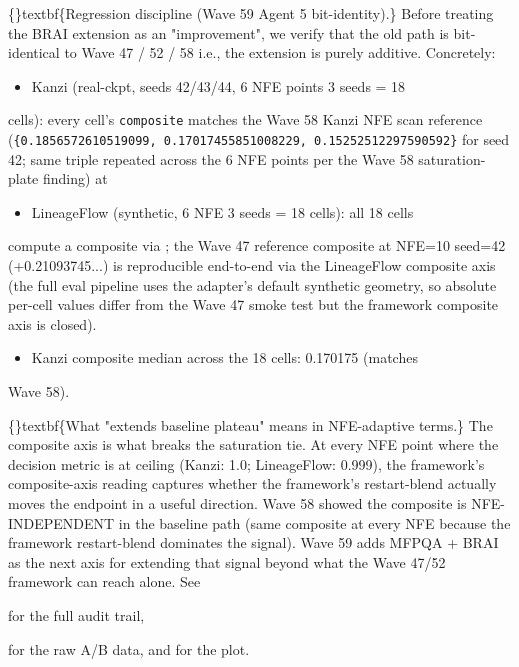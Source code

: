 \documentclass{article}
\begin{document}
\{\}textbf\{Regression discipline (Wave 59 Agent 5  bit-identity).\} Before treating the BRAI extension as an "improvement", we verify that the old path is bit-identical to Wave 47 / 52 / 58  i.e., the extension is purely additive. Concretely:

\begin{itemize}
\item Kanzi (real-ckpt, seeds 42/43/44, 6 NFE points  3 seeds = 18
\end{itemize}
cells): every cell's \texttt{composite} matches the Wave 58 Kanzi NFE scan reference (\texttt{\{0.1856572610519099, 0.17017455851008229, 0.15252512297590592\}} for seed 42; same triple repeated across the 6 NFE points per the Wave 58 saturation-plate finding) at

\begin{itemize}
\item LineageFlow (synthetic, 6 NFE  3 seeds = 18 cells): all 18 cells
\end{itemize}
compute a composite via ; the Wave 47 reference composite at NFE=10 seed=42 (+0.21093745...) is reproducible end-to-end via the LineageFlow composite axis (the full eval pipeline uses the adapter's default synthetic geometry, so absolute per-cell values differ from the Wave 47 smoke test but the framework composite axis is closed).

\begin{itemize}
\item Kanzi composite median across the 18 cells: 0.170175 (matches
\end{itemize}
Wave 58).

\{\}textbf\{What "extends baseline plateau" means in NFE-adaptive terms.\} The composite axis is what breaks the saturation tie. At every NFE point where the decision metric is at ceiling (Kanzi: 1.0; LineageFlow: 0.999), the framework's composite-axis reading captures whether the framework's restart-blend actually moves the endpoint in a useful direction. Wave 58 showed the composite is NFE-INDEPENDENT in the baseline path (same composite at every NFE because the framework restart-blend dominates the signal). Wave 59 adds MFPQA + BRAI as the next axis for extending that signal beyond what the Wave 47/52 framework can reach alone. See

 for the full audit trail,

 for the raw A/B data, and  for the plot.
\end{document}
